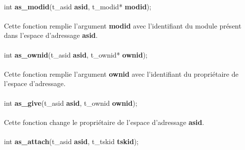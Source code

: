 \documentclass[10pt,a4wide]{article}
\begin{document}
\paragraph{}

\hspace{1.5cm}int \textbf{as\_modid}(t\_asid \textbf{asid},
                                     t\_modid* \textbf{modid});

\paragraph{}

Cette fonction remplie l'argument \textbf{modid} avec l'identifiant
du module pr\'esent dans l'espace d'adressage \textbf{asid}.

\paragraph{}

\hspace{1.5cm}int \textbf{as\_ownid}(t\_asid \textbf{asid},
                                     t\_ownid* \textbf{ownid});

\paragraph{}

Cette fonction remplie l'argument \textbf{ownid} avec l'identifiant
du propri\'etaire de l'espace d'adressage.

\paragraph{}

\hspace{1.5cm}int \textbf{as\_give}(t\_asid \textbf{asid},
                                    t\_ownid \textbf{ownid});

\paragraph{}

Cette fonction change le propri\'etaire de l'espace d'adressage
\textbf{asid}.

\paragraph{}

\hspace{1.5cm}int \textbf{as\_attach}(t\_asid \textbf{asid},
                                      t\_tskid \textbf{tskid});
\end{document}
